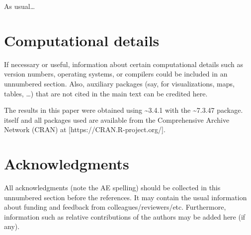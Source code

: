 \documentclass[
  article]{jss}
\begin{document}
\begin{tcolorbox}[enhanced jigsaw, bottomrule=.15mm, colback=white, left=2mm, breakable, toprule=.15mm, opacityback=0, arc=.35mm, colframe=quarto-callout-color-frame, rightrule=.15mm, leftrule=.75mm]

As usual\ldots{}

\end{tcolorbox}

\hypertarget{computational-details}{%
\section*{Computational details}\label{computational-details}}

\begin{tcolorbox}[enhanced jigsaw, bottomrule=.15mm, colback=white, left=2mm, breakable, toprule=.15mm, opacityback=0, arc=.35mm, colframe=quarto-callout-color-frame, rightrule=.15mm, leftrule=.75mm]

If necessary or useful, information about certain computational details
such as version numbers, operating systems, or compilers could be
included in an unnumbered section. Also, auxiliary packages (say, for
visualizations, maps, tables, \ldots) that are not cited in the main
text can be credited here.

\end{tcolorbox}

The results in this paper were obtained using
\textasciitilde3.4.1 with the
\textasciitilde7.3.47 package.  itself and all
packages used are available from the Comprehensive  Archive
Network (CRAN) at {[}https://CRAN.R-project.org/{]}.

\hypertarget{acknowledgments}{%
\section*{Acknowledgments}\label{acknowledgments}}

\begin{tcolorbox}[enhanced jigsaw, bottomrule=.15mm, colback=white, left=2mm, breakable, toprule=.15mm, opacityback=0, arc=.35mm, colframe=quarto-callout-color-frame, rightrule=.15mm, leftrule=.75mm]

All acknowledgments (note the AE spelling) should be collected in this
unnumbered section before the references. It may contain the usual
information about funding and feedback from colleagues/reviewers/etc.
Furthermore, information such as relative contributions of the authors
may be added here (if any).

\end{tcolorbox}
\end{document}
